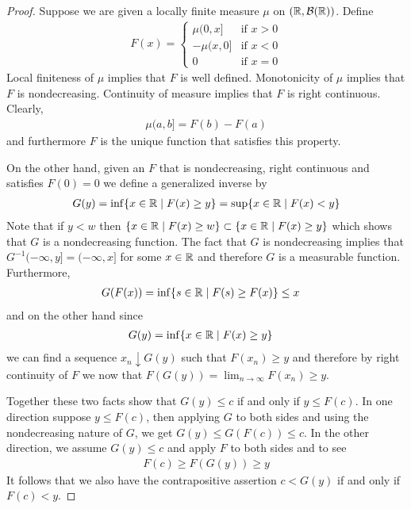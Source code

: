 \begin{proof}
Suppose we are given a locally finite measure $\mu$ on
$(\mathbb{R},\mathcal{B}(\mathbb{R}))$.  Define
\begin{align*}
F(x) = \begin{cases}
\mu (0,x] & \text{if $x > 0$}\\
-\mu (x, 0] & \text{if $x < 0$}\\
0 & \text{if $x=0$}
\end{cases}
\end{align*}
Local finiteness of $\mu$ implies that $F$ is well defined.
Monotonicity of $\mu$ implies that $F$ is nondecreasing.  Continuity
of measure implies that $F$ is right continuous.  Clearly, 
\begin{align*}
\mu (a,b] = F(b) - F(a)
\end{align*} and furthermore $F$ is the unique function that satisfies
this property.

On the other hand, given an $F$ that is nondecreasing, right
continuous and satisfies $F(0) = 0$ we define a generalized inverse by 
\begin{align*}
G(y) = \inf \lbrace x \in \mathbb{R} \mid F(x) \geq y \rbrace = \sup
\lbrace x \in \mathbb{R} \mid F(x) < y \rbrace
\end{align*}
Note that if $y < w$ then $\lbrace x \in \mathbb{R} \mid F(x) \geq w
\rbrace \subset \lbrace x \in \mathbb{R} \mid F(x) \geq y \rbrace$ which
shows that $G$ is a nondecreasing function.  The fact that $G$ is
nondecreasing implies that $G^{-1} (-\infty, y] = (-\infty, x]$ for
some $x \in \mathbb{R}$ and therefore $G$ is a measurable function.  
Furthermore, 
\begin{align*}
G(F(x)) &= \inf\lbrace s \in \mathbb{R} \mid F(s) \geq F(x)
\rbrace \leq x
\end{align*}
and on the other hand since 
\begin{align*}
G(y) &= \inf\lbrace x \in \mathbb{R} \mid F(x) \geq y
\rbrace 
\end{align*}
we can find a sequence $x_n \downarrow G(y)$ such that $F(x_n) \geq y$
and therefore by right continuity of $F$ we now that $F(G(y)) =
\lim_{n\to\infty} F(x_n) \geq y$.

Together these two facts show that 
$G(y) \leq c$ if and only if $y \leq F(c)$.  In one direction suppose
$y \leq F(c)$, then applying $G$ to both sides and using the
nondecreasing nature of $G$, we get $G(y) \leq G(F(c)) \leq c$.  In
the other direction, we assume $G(y) \leq c$ and apply $F$ to both
sides and to see
\begin{align*}
F(c) \geq F(G(y)) \geq y
\end{align*}
It follows that we also have the contrapositive assertion $c < G(y)$ if and only if $F(c) < y$.


\end{proof}
